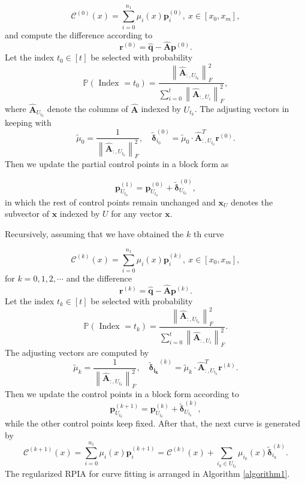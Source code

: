 \documentclass[11pt]{article}
\numberwithin{equation}{section}
\begin{document}
$$
\mathcal{C}^{(0)}(x)=\sum_{i=0}^{n_{1}} \mu_{i}(x) \boldsymbol{p}_{i}^{(0)}, ~x \in\left[x_{0}, x_{m}\right],
$$
and compute the difference according to
$$
\boldsymbol{r}^{(0)}=\hat{\boldsymbol{q}}-\hat{\boldsymbol{A}} \boldsymbol{p}^{(0)} .
$$
Let the index $t_{0} \in[t]$ be selected with probability
$$
\mathbb{P}\left(\text { Index }=t_0\right)=\frac{\left\|\hat{\boldsymbol{A}}_{:, U_{t_0}}\right\|_F^2}{\sum_{i=0}^t\left\|\hat{\boldsymbol{A}}_{:, U_{i}}\right\|_F^2},
$$
where $\hat{\boldsymbol{A}}_{U_{t_k}}$ denote the columns of $\hat{\boldsymbol{A}}$ indexed by $U_{t_k}$. The adjusting vectors in keeping with
$$
\tilde{\mu}_0=\frac{1}{\left\|\hat{\boldsymbol{A}}_{:, U_{t_0}}\right\|_F^2}, \quad \boldsymbol{\tilde\delta}_{i_0}^{(0)}=\tilde{\mu}_0 \cdot \hat{\boldsymbol{A}}_{:, U_{t_0}}^T \boldsymbol{r}^{(0)}.
$$
Then we update the partial control points in a block form as

$$
\boldsymbol{p}_{U_{t_{0}}}^{(1)}=\boldsymbol{p}_{U_{t_{0}}}^{(0)}+\boldsymbol{\tilde\delta}_{U_{t_{0}}}^{(0)},
$$
in which the rest of control points remain unchanged and $\boldsymbol{x}_{U}$ denotes the subvector of $\boldsymbol{x}$ indexed by $U$ for any vector $\boldsymbol{x}$.

Recursively, assuming that we have obtained the $k$ th curve

\begin{equation}\label{3.1}
\mathcal{C}^{(k)}(x)=\sum_{i=0}^{n_{1}} \mu_{i}(x) \boldsymbol{p}_{i}^{(k)}, ~x \in\left[x_{0}, x_{m}\right],
\end{equation}
for $k=0,1,2, \cdots$ and the difference
\begin{equation}\label{3.2}
\boldsymbol{r}^{(k)}=\hat{\boldsymbol{q}}-\hat{\boldsymbol{A}} \boldsymbol{p}^{(k)}.
\end{equation}
Let the index $t_{k} \in[t]$ be selected with probability
\begin{equation}\label{3.3}
\mathbb{P}\left(\text { Index }=t_k\right)=\frac{\left\|\hat{\boldsymbol{A}}_{:, U_{t_k}}\right\|_F^2}{\sum_{i=0}^t\left\|\hat{\boldsymbol{A}}_{:, U_{i}}\right\|_F^2}.
\end{equation}
The adjusting vectors are computed by
\begin{equation}\label{3.4}
\tilde{\mu}_k=\frac{1}{\left\|\hat{\boldsymbol{A}}_{:, U_{t_k}}\right\|_F^2}, \quad \boldsymbol{\tilde\delta_{i_k}}^{(k)}=\tilde{\mu}_k \cdot \hat{\boldsymbol{A}}_{:, U_{t_k}}^T \boldsymbol{r}^{(k)}. 
\end{equation}
Then we update the control points in a block form according to
\begin{equation}\label{3.5}
\boldsymbol{p}_{U_{t_{k}}}^{(k+1)}=\boldsymbol{p}_{U_{t_{k}}}^{(k)}+\boldsymbol{\tilde\delta}_{U_{t_{k}}}^{(k)},
\end{equation}
while the other control points keep fixed. After that, the next curve is generated by
$$
\mathcal{C}^{(k+1)}(x)=\sum_{i=0}^{n_{1}} \mu_{i}(x) \boldsymbol{p}_{i}^{(k+1)}=\mathcal{C}^{(k)}(x)+\sum_{i_{k} \in U_{t_{k}}} \mu_{i_{k}}(x) \boldsymbol{\tilde\delta}_{i_{k}}^{(k)} .
$$
The regularized RPIA for curve fitting is arranged in Algorithm \ref{algorithm1}.
\end{document}
